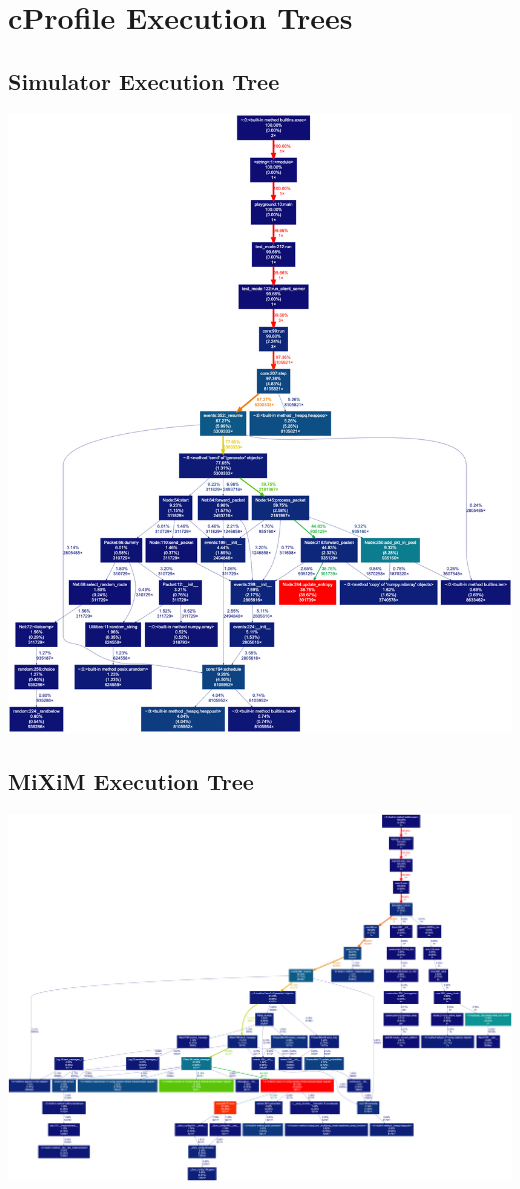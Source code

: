 \documentclass[logo,msc,cyber]{infthesis}   %
\begin{document}
\chapter{cProfile Execution Trees}

\section{Simulator Execution Tree}

\includegraphics[width=\textwidth]{images/cprofile_simulator.png}

\section{MiXiM Execution Tree}

\includegraphics[width=\textwidth]{images/cprofile_mixim.png}
\end{document}
